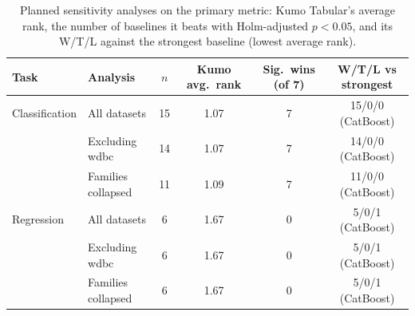 \begin{table}[t]
\centering
\small
\caption{Planned sensitivity analyses on the primary metric: Kumo Tabular's average rank, the number of baselines it beats with Holm-adjusted $p<0.05$, and its W/T/L against the strongest baseline (lowest average rank).}
\label{tab:sensitivity}
\begin{tabular}{llcccc}
\toprule
Task & Analysis & $n$ & Kumo avg.\ rank & Sig.\ wins (of 7) & W/T/L vs strongest \\
\midrule
Classification & All datasets & 15 & 1.07 & 7 & 15/0/0 (CatBoost) \\
 & Excluding wdbc & 14 & 1.07 & 7 & 14/0/0 (CatBoost) \\
 & Families collapsed & 11 & 1.09 & 7 & 11/0/0 (CatBoost) \\
\midrule
Regression & All datasets & 6 & 1.67 & 0 & 5/0/1 (CatBoost) \\
 & Excluding wdbc & 6 & 1.67 & 0 & 5/0/1 (CatBoost) \\
 & Families collapsed & 6 & 1.67 & 0 & 5/0/1 (CatBoost) \\
\bottomrule
\end{tabular}
\end{table}
